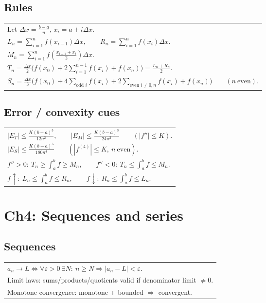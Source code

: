 \documentclass[10pt]{article}
\begin{document}
\begin{multicols}{3}
\subsection*{Rules}
\begin{tabular}{@{}p{}@{}}
Let $\Delta x=\frac{b-a}{n}$, $x_i=a+i\Delta x$.\\
$L_n=\displaystyle\sum_{i=1}^n f(x_{i-1})\Delta x,\qquad
R_n=\sum_{i=1}^n f(x_i)\Delta x.$\\
$M_n=\displaystyle\sum_{i=1}^n f\!\left(\frac{x_{i-1}+x_i}{2}\right)\Delta x.$\\
$T_n=\displaystyle\frac{\Delta x}{2}\Big(f(x_0)+2\sum_{i=1}^{n-1}f(x_i)+f(x_n)\Big)=\frac{L_n+R_n}{2}.$\\
$S_n=\displaystyle\frac{\Delta x}{3}\Big(f(x_0)+4\sum_{\text{odd }i}f(x_i)+2\sum_{\text{even }i\neq0,n}f(x_i)+f(x_n)\Big)\qquad (n\ \text{even}).$\\
\end{tabular}

\subsection*{Error / convexity cues}
\begin{tabular}{@{}p{}@{}}
$|E_T|\le \displaystyle\frac{K(b-a)^3}{12n^2},\qquad |E_M|\le \frac{K(b-a)^3}{24n^2}\qquad (|f''|\le K).$\\
$|E_S|\le \displaystyle\frac{K(b-a)^5}{180n^4}\qquad (|f^{(4)}|\le K,\ n\ \text{even}).$\\
$f''>0:\ T_n\ge \displaystyle\int_a^b f \ge M_n,\qquad f''<0:\ T_n\le \int_a^b f \le M_n.$\\
$f\uparrow:\ L_n\le \displaystyle\int_a^b f\le R_n,\qquad f\downarrow:\ R_n\le \int_a^b f\le L_n.$\\
\end{tabular}

\section*{Ch4: Sequences and series}
\subsection*{Sequences}
\begin{tabular}{@{}p{}@{}}
$a_n\to L\iff \forall\varepsilon>0\ \exists N:\ n\ge N\Rightarrow |a_n-L|<\varepsilon.$\\
Limit laws: sums/products/quotients valid if denominator limit $\neq 0$.\\
Monotone convergence: monotone + bounded $\Rightarrow$ convergent.\\
\end{tabular}


\end{multicols}
\end{document}

